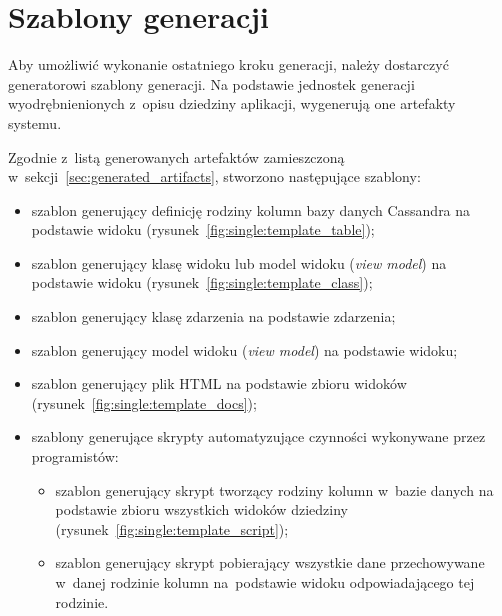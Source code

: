 \section{Szablony generacji}

Aby umożliwić wykonanie ostatniego kroku generacji, należy dostarczyć generatorowi szablony generacji.
Na podstawie jednostek generacji wyodrębnienionych z~opisu dziedziny aplikacji, wygenerują one artefakty systemu.

Zgodnie z~listą generowanych artefaktów zamieszczoną w~sekcji~\ref{sec:generated_artifacts}, stworzono następujące szablony:

\begin{itemize}
 \item szablon generujący definicję rodziny kolumn bazy danych Cassandra na podstawie widoku (rysunek~\ref{fig:single:template_table});
 \item szablon generujący klasę widoku lub model widoku (\emph{view model}) na podstawie widoku (rysunek~\ref{fig:single:template_class});
 \item szablon generujący klasę zdarzenia na podstawie zdarzenia;
 \item szablon generujący model widoku (\emph{view model}) na podstawie widoku;
 \item szablon generujący plik HTML na podstawie zbioru widoków (rysunek~\ref{fig:single:template_docs});
 \item szablony generujące skrypty automatyzujące czynności wykonywane przez programistów:
  \begin{itemize}
   \item szablon generujący skrypt tworzący rodziny kolumn w~bazie danych na podstawie zbioru wszystkich widoków dziedziny (rysunek~\ref{fig:single:template_script});
   \item szablon generujący skrypt pobierający wszystkie dane przechowywane w~danej rodzinie kolumn na~podstawie widoku odpowiadającego tej rodzinie.
  \end{itemize}
\end{itemize}











